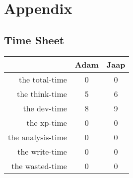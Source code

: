 \section{Appendix}

\subsection{Time Sheet}


\begin{tabular}{| r | c | c |}
	\hline
 					& Adam 	& Jaap \\ \hline
  	the total-time 	& 0 		& 0 	\\ \hline
	the think-time 	& 5 		& 6 	\\ \hline
 	the dev-time		& 8 		& 9 	\\ \hline
	the xp-time		& 0		& 0	\\ \hline
	the analysis-time 	& 0		& 0	\\ \hline
	the write-time 	& 0		& 0	\\ \hline
	the wasted-time 	& 0		& 0	\\ \hline
\end{tabular}

